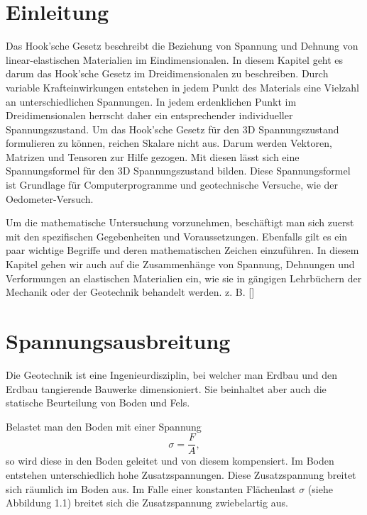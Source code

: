 \section{Einleitung\label{spannung:section:Einleitung}}
Das Hook'sche Gesetz beschreibt die Beziehung von Spannung und Dehnung von linear-elastischen Materialien im Eindimensionalen.
In diesem Kapitel geht es darum das Hook'sche Gesetz im Dreidimensionalen zu beschreiben.
Durch variable Krafteinwirkungen entstehen in jedem Punkt des Materials eine Vielzahl an unterschiedlichen Spannungen.
In jedem erdenklichen Punkt im Dreidimensionalen herrscht daher ein entsprechender individueller Spannungszustand.
Um das Hook'sche Gesetz für den 3D Spannungszustand formulieren zu können, reichen Skalare nicht aus.
Darum werden Vektoren, Matrizen und Tensoren zur Hilfe gezogen.
Mit diesen lässt sich eine Spannungsformel für den 3D Spannungszustand bilden.
Diese Spannungsformel ist Grundlage für Computerprogramme und geotechnische Versuche, wie der Oedometer-Versuch.

Um die mathematische Untersuchung vorzunehmen, beschäftigt man sich zuerst mit den spezifischen Gegebenheiten und Voraussetzungen.
Ebenfalls gilt es ein paar wichtige Begriffe und deren mathematischen Zeichen einzuführen.
In diesem Kapitel gehen wir auch auf die Zusammenhänge von Spannung, Dehnungen und Verformungen an elastischen Materialien ein,
wie sie in gängigen Lehrbüchern der Mechanik oder der Geotechnik behandelt werden. z. B. [\cite{spannung:Grundlagen der Geotechnik}]

\section{Spannungsausbreitung\label{spannung:section:Spannungsausbreitung}}
Die Geotechnik ist eine Ingenieurdisziplin, bei welcher man Erdbau und den Erdbau tangierende Bauwerke dimensioniert.
Sie beinhaltet aber auch die statische Beurteilung von Boden und Fels.

Belastet man den Boden mit einer Spannung
\[
\sigma
=
\frac{F}{A}
,
\]
so wird diese in den Boden geleitet und von diesem kompensiert.
Im Boden entstehen unterschiedlich hohe Zusatzspannungen.
Diese Zusatzspannung breitet sich räumlich im Boden aus.
Im Falle einer konstanten Flächenlast $\sigma$ (siehe Abbildung 1.1) breitet sich die Zusatzspannung zwiebelartig aus.

